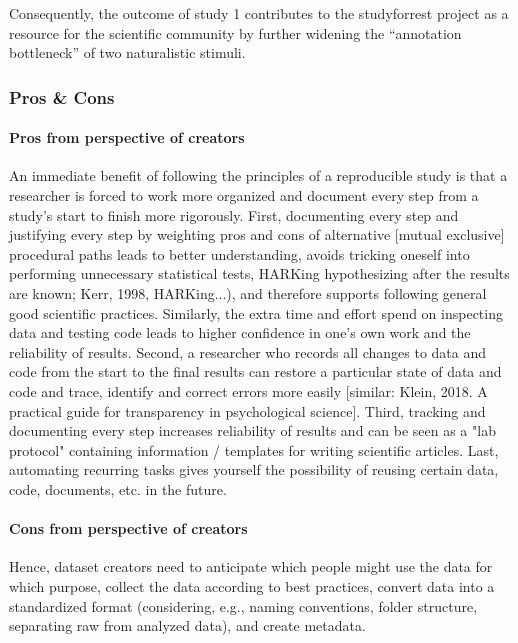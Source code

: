 %
Consequently, the outcome of study 1 contributes to the studyforrest project as
a resource for the scientific community by further widening the ``annotation
bottleneck'' \citep{aliko2020naturalistic} of two naturalistic stimuli.



\subsubsection{Pros \& Cons}


\paragraph{Pros from perspective of creators}

An immediate benefit of following the principles of a reproducible study is that
a researcher is forced to work more organized and document every step from a
study's start to finish more rigorously.
%
First, documenting every step and justifying every step by weighting pros and
cons of alternative [mutual exclusive] procedural paths leads to better
understanding, avoids tricking oneself into performing unnecessary statistical
tests, HARKing hypothesizing after the results are known; Kerr, 1998,
HARKing...), and therefore supports following general good scientific practices.
%
Similarly, the extra time and effort spend on inspecting data and testing code
leads to higher confidence in one's own work and the reliability of results.
%
Second, a researcher who records all changes to data and code from the start to
the final results can restore a particular state of data and code and trace,
identify and correct errors more easily [similar: Klein, 2018. A practical guide
for transparency in psychological science].
%
Third, tracking and documenting every step increases reliability of results and
can be seen as a "lab protocol" containing information / templates for writing
scientific articles.
%
Last, automating recurring tasks gives yourself the possibility of reusing
certain data, code, documents, etc. in the future.


\paragraph{Cons from perspective of creators}

%
Hence, dataset creators need to anticipate which people might use the data for
which purpose, collect the data according to best practices, convert data into a
standardized format (considering, e.g., naming conventions, folder structure,
separating raw from analyzed data), and create metadata.

